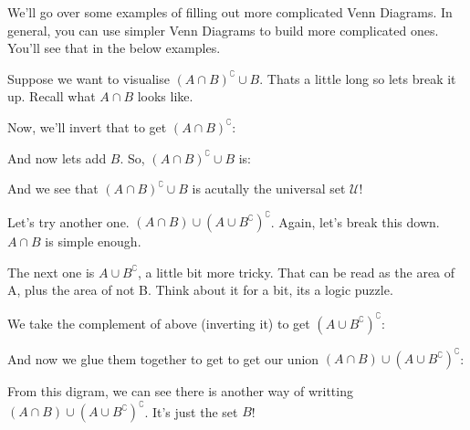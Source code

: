 We'll go over some examples of filling out more complicated Venn Diagrams. In general, you can use simpler Venn Diagrams to build more complicated ones. You'll see that in the below examples.

\begin{boxexample}{}{}
	Suppose we want to visualise $(A \cap B)^\complement \cup B$. Thats a little long so lets break it up. Recall what $A \cap B$ looks like.

	\begin{venndiagram2sets}[shade=skyblue,labelNotAB={$\mathcal{U}$}]
		\fillACapB
	\end{venndiagram2sets}

	Now, we'll invert that to get $(A \cap B)^\complement$:

	\begin{venndiagram2sets}[shade=skyblue,labelNotAB={$\mathcal{U}$}]
		\fillNotAorNotB
	\end{venndiagram2sets}

	And now lets add $B$. So, $(A \cap B)^\complement \cup B$ is:

	\begin{venndiagram2sets}[shade=skyblue,labelNotAB={$\mathcal{U}$}]
		\fillAll
	\end{venndiagram2sets}

	And we see that $(A \cap B)^\complement \cup B$ is acutally the universal set $\mathcal{U}$!
\end{boxexample}

\begin{boxexample}{}{}
	Let's try another one. $(A \cap B) \cup (A \cup B^\complement)^\complement$. Again, let's break this down. $A \cap B$ is simple enough.

	\begin{venndiagram2sets}[shade=skyblue,labelNotAB={$\mathcal{U}$}]
		\fillACapB
	\end{venndiagram2sets}

	The next one is $A \cup B^\complement$, a little bit more tricky. That can be read as the area of A, plus the area of not B. Think about it for a bit, its a logic puzzle.
	\begin{venndiagram2sets}[shade=skyblue,labelNotAB={$\mathcal{U}$}]
		\fillA \fillNotAorB
	\end{venndiagram2sets}

	We take the complement of above (inverting it) to get $(A \cup B^\complement)^\complement$:

	\begin{venndiagram2sets}[shade=skyblue,labelNotAB={$\mathcal{U}$}]
		\fillOnlyB
	\end{venndiagram2sets}

	And now we glue them together to get to get our union $(A \cap B) \cup (A \cup B^\complement)^\complement$:

	\begin{venndiagram2sets}[shade=skyblue,labelNotAB={$\mathcal{U}$}]
		\fillB
	\end{venndiagram2sets}

	From this digram, we can see there is another way of writting $(A \cap B) \cup (A \cup B^\complement)^\complement$. It's just the set $B$!
\end{boxexample}

